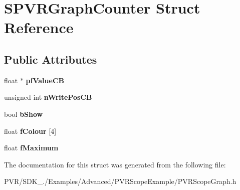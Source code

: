 \hypertarget{struct_s_p_v_r_graph_counter}{\section{S\+P\+V\+R\+Graph\+Counter Struct Reference}
\label{struct_s_p_v_r_graph_counter}
}
\subsection*{Public Attributes}
\begin{DoxyCompactItemize}
\item 
\hypertarget{struct_s_p_v_r_graph_counter_a854a04d94b996f4e2c0ffd253732e204}{float $\ast$ {\bfseries pf\+Value\+C\+B}}\label{struct_s_p_v_r_graph_counter_a854a04d94b996f4e2c0ffd253732e204}

\item 
\hypertarget{struct_s_p_v_r_graph_counter_a5a3df8d05659bec4aca9c152b5613dec}{unsigned int {\bfseries n\+Write\+Pos\+C\+B}}\label{struct_s_p_v_r_graph_counter_a5a3df8d05659bec4aca9c152b5613dec}

\item 
\hypertarget{struct_s_p_v_r_graph_counter_a25eeb59fcc2a56f175c163c491924c0f}{bool {\bfseries b\+Show}}\label{struct_s_p_v_r_graph_counter_a25eeb59fcc2a56f175c163c491924c0f}

\item 
\hypertarget{struct_s_p_v_r_graph_counter_a0bf8224bfcbbc88ee38a60517839ec4f}{float {\bfseries f\+Colour} \mbox{[}4\mbox{]}}\label{struct_s_p_v_r_graph_counter_a0bf8224bfcbbc88ee38a60517839ec4f}

\item 
\hypertarget{struct_s_p_v_r_graph_counter_acfa68f76a4b40616b9735f6c89ae4cbf}{float {\bfseries f\+Maximum}}\label{struct_s_p_v_r_graph_counter_acfa68f76a4b40616b9735f6c89ae4cbf}

\end{DoxyCompactItemize}


The documentation for this struct was generated from the following file\+:\begin{DoxyCompactItemize}
\item 
P\+V\+R/\+S\+D\+K\+\_./\+Examples/\+Advanced/\+P\+V\+R\+Scope\+Example/P\+V\+R\+Scope\+Graph.\+h\end{DoxyCompactItemize}
